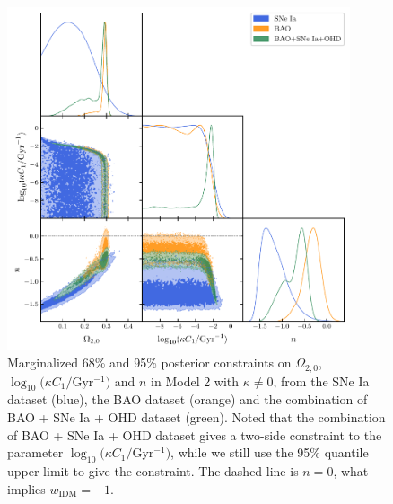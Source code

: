 \documentclass[twocolumn]{aastex631}
\begin{document}
   \begin{figure}
      \centering
      \includegraphics[width=0.9\textwidth]{model2_kneq0.pdf}
      \caption{
         Marginalized 68\% and 95\% posterior constraints on $\Omega_{2,0}$, 
         $\log_{10}(\kappa C_1/$Gyr${}^{-1})$ and $n$ in Model 2 with $\kappa\neq0$,
         from the SNe Ia dataset (blue), the BAO dataset (orange) and the 
         combination of BAO + SNe Ia + OHD dataset (green). Noted that
         the combination of BAO + SNe Ia + OHD dataset gives a two-side constraint
         to the parameter $\log_{10}(\kappa C_1/$Gyr${}^{-1})$, while we still
         use the 95\% quantile upper limit to give the constraint.
         The dashed line is $n=0$, what implies $w_{\text{IDM}}=-1$.
      }
      \label{fig:2}
   \end{figure}
\end{document}
